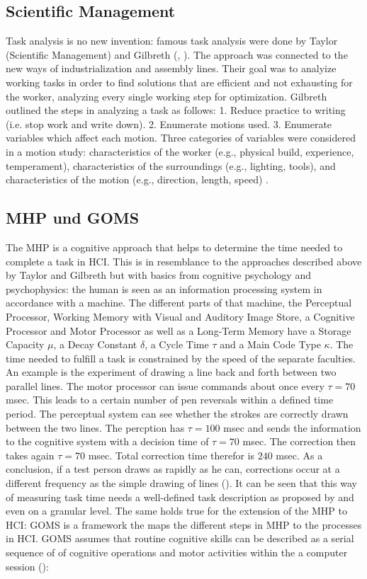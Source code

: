 \subsection{Scientific Management}
Task analysis is no new invention: famous task analysis were done by Taylor (Scientific Management) and Gilbreth (\cite{taylor2013scientific}, \cite{gilbreth1911motion}). The approach was connected to the new ways of industrialization and assembly lines. Their goal was to analyize working tasks in order to find solutions that are efficient and not exhausting for the worker, analyzing every single working step for optimization. Gilbreth outlined the steps in analyzing a task as follows: 1. Reduce practice to writing (i.e. stop work and write down). 2. Enumerate motions used. 3. Enumerate variables which affect each motion. Three categories of variables were considered in a motion study: characteristics of the worker (e.g., physical build, experience, temperament), characteristics of the surroundings (e.g., lighting, tools), and characteristics of the motion (e.g., direction, length, speed) \cite{creighton1992origin}.

\subsection{\ac{MHP} und \ac{GOMS}}
The \ac{MHP} is a cognitive approach that helps to determine the time needed to complete a task in \ac{HCI}. This is in resemblance to the approaches described above by Taylor and Gilbreth but with basics from cognitive psychology and psychophysics: the human is seen as an information processing system in accordance with a machine. The different parts of that machine, the Perceptual Processor, Working Memory with Visual and Auditory Image Store, a Cognitive Processor and Motor Processor as well as a Long-Term Memory have a Storage Capacity $\mu$, a Decay Constant $\delta$, a Cycle Time $\tau$ and a Main Code Type $\kappa$. The time needed to fulfill a task is constrained by the speed of the separate faculties. An example is the experiment of drawing a line back and forth between two parallel lines. The motor processor can issue commands about once every $\tau=70$ msec. This leads to a certain number of pen reversals within a defined time period. The perceptual system can see whether the strokes are correctly drawn between the two lines. The percption has $\tau=100$ msec and sends the information to the cognitive system with a decision time of $\tau=70$ msec. The correction then takes again $\tau=70$ msec. Total correction time therefor is $240$ msec. As a conclusion, if a test person draws as rapidly as he can, corrections occur at a different frequency as the simple drawing of lines (\cite{card1986model}). It can be seen that this way of measuring task time needs a well-defined task description as proposed by \cite{annett1967task} and even on a granular level. The same holds true for the extension of the \ac{MHP} to \ac{HCI}: \ac{GOMS} is a framework the maps the different steps in \ac{MHP} to the processes in \ac{HCI}. \ac{GOMS} assumes that routine cognitive skills can be described as a serial sequence of of cognitive operations and motor activities within the a computer session (\cite{olson1990growth}):




